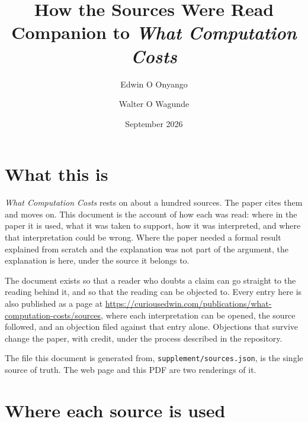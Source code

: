 \documentclass[11pt,oneside]{article}
\title{\vspace{-1.2cm}\textbf{\color{accent}How the Sources Were Read}\\[0.3cm]
\large Companion to \emph{What Computation Costs}}
\author{Edwin O Onyango \and Walter O Wagunde}
\date{September 2026}
\begin{document}
\maketitle
\thispagestyle{empty}

\section*{What this is}
\emph{What Computation Costs} rests on about a hundred sources. The paper cites them and moves
on. This document is the account of how each was read: where in the paper it is used, what it
was taken to support, how it was interpreted, and where that interpretation could be wrong.
Where the paper needed a formal result explained from scratch and the explanation was not part
of the argument, the explanation is here, under the source it belongs to.

The document exists so that a reader who doubts a claim can go straight to the reading behind
it, and so that the reading can be objected to. Every entry here is also published as a page at
\url{https://curiousedwin.com/publications/what-computation-costs/sources}, where each
interpretation can be opened, the source followed, and an objection filed against that entry
alone. Objections that survive change the paper, with credit, under the process described in
the repository.

The file this document is generated from, \texttt{supplement/sources.json}, is the single source
of truth. The web page and this PDF are two renderings of it.

\section*{Where each source is used}
\end{document}
